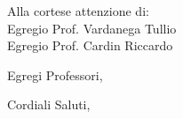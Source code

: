 \documentclass[11pt]{letter}
\begin{document}
\begin{letter}{Alla cortese attenzione di: \\ Egregio Prof. Vardanega Tullio \\ Egregio Prof. Cardin Riccardo}
\date{8 Gennaio, 2021}
\opening{Egregi Professori,}
\lipsum[1-2]
\closing{Cordiali Saluti,}
\end{letter}
\end{document}
